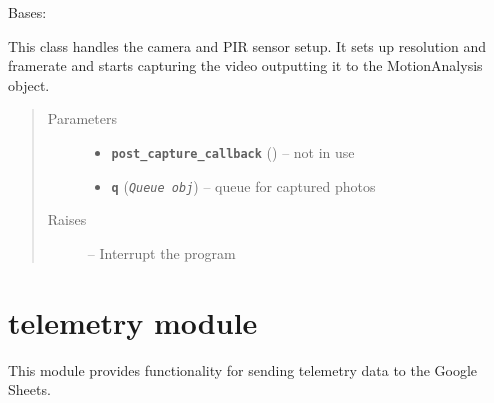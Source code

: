 \documentclass[letterpaper,10pt,english,openany]{sphinxmanual}
\begin{document}
\begin{fulllineitems}
\label{index:rpicameramon.motion.PiMotion}
Bases: 

This class handles the camera and PIR sensor setup.
It sets up resolution and framerate and starts
capturing the video outputting it to the MotionAnalysis object.
\begin{quote}\begin{description}
\item[{Parameters}] \leavevmode\begin{itemize}
\item {} 
\textbf{\texttt{post\_capture\_callback}} ({\hyperref[index:rpicameramon.motion.CaptureHandler.callback]{}}) -- not in use

\item {} 
\textbf{\texttt{q}} (\emph{\texttt{Queue obj}}) -- queue for captured photos

\end{itemize}

\item[{Raises}] \leavevmode
{} -- Interrupt the program

\end{description}\end{quote}

\begin{fulllineitems}
\label{index:rpicameramon.motion.PiMotion.start}
\end{fulllineitems}


\end{fulllineitems}



\chapter{telemetry module}
\label{index:telemetry-module}
This module provides functionality for sending telemetry data to the Google Sheets.
\label{index:module-rpicameramon.telemetry}
\end{document}
